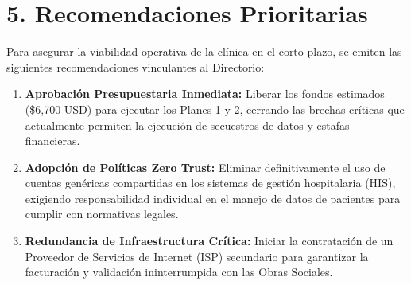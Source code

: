 \documentclass[11pt,a4paper]{article}
\begin{document}
\vspace{0.5cm}

\section*{5. Recomendaciones Prioritarias}
Para asegurar la viabilidad operativa de la clínica en el corto plazo, se emiten las siguientes recomendaciones vinculantes al Directorio:

\begin{enumerate}
    \item \textbf{Aprobación Presupuestaria Inmediata:} Liberar los fondos estimados (\$6,700 USD) para ejecutar los Planes 1 y 2, cerrando las brechas críticas que actualmente permiten la ejecución de secuestros de datos y estafas financieras.
    \item \textbf{Adopción de Políticas Zero Trust:} Eliminar definitivamente el uso de cuentas genéricas compartidas en los sistemas de gestión hospitalaria (HIS), exigiendo responsabilidad individual en el manejo de datos de pacientes para cumplir con normativas legales.
    \item \textbf{Redundancia de Infraestructura Crítica:} Iniciar la contratación de un Proveedor de Servicios de Internet (ISP) secundario para garantizar la facturación y validación ininterrumpida con las Obras Sociales.
\end{enumerate}
\end{document}
